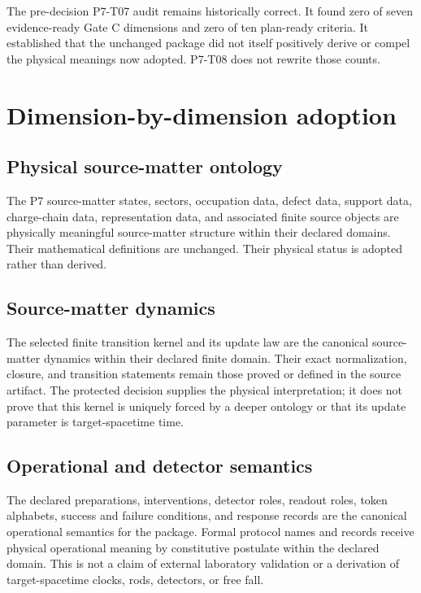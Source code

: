\documentclass[11pt]{article}
\begin{document}
The pre-decision P7-T07 audit remains historically correct.  It found zero of seven
evidence-ready Gate C dimensions and zero of ten plan-ready criteria.
It established that the unchanged package did not itself positively derive or
compel the physical meanings now adopted.  P7-T08 does not rewrite those
counts.

\section{Dimension-by-dimension adoption}

\subsection{Physical source-matter ontology}

The P7 source-matter states, sectors, occupation data, defect data, support
data, charge-chain data, representation data, and associated finite source
objects are physically meaningful source-matter structure within their
declared domains.  Their mathematical definitions are unchanged.  Their
physical status is adopted rather than derived.

\subsection{Source-matter dynamics}

The selected finite transition kernel and its update law are the canonical
source-matter dynamics within their declared finite domain.  Their exact
normalization, closure, and transition statements remain those proved or
defined in the source artifact.  The protected decision supplies the physical
interpretation; it does not prove that this kernel is uniquely forced by a
deeper ontology or that its update parameter is target-spacetime time.

\subsection{Operational and detector semantics}

The declared preparations, interventions, detector roles, readout roles,
token alphabets, success and failure conditions, and response records are the
canonical operational semantics for the package.  Formal protocol names and
records receive physical operational meaning by constitutive postulate within
the declared domain.  This is not a claim of external laboratory validation
or a derivation of target-spacetime clocks, rods, detectors, or free fall.
\end{document}

